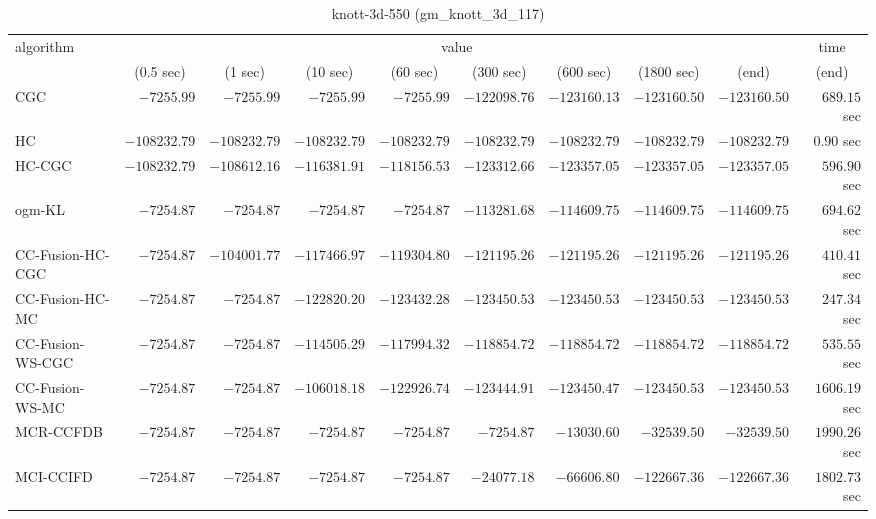 \begin{table}[H]
\scriptsize
\centering
\caption{knott-3d-550 (gm\_knott\_3d\_117)}
\label{tab:anytimetable-knott-3d-550-gm-knott-3d-117}
\begin{tabular}{lrrrrrrrrr}
\toprule
           algorithm &                                   \multicolumn{8}{c}{value} & \multicolumn{1}{c}{time}   \\  
\cmidrule(lr){2-9}\cmidrule(lr){10-10}   
                     & \multicolumn{1}{c}{(0.5 sec)} & \multicolumn{1}{c}{(1 sec)} & \multicolumn{1}{c}{(10 sec)} & \multicolumn{1}{c}{(60 sec)} & \multicolumn{1}{c}{(300 sec)} & \multicolumn{1}{c}{(600 sec)} & \multicolumn{1}{c}{(1800 sec)} & \multicolumn{1}{c}{(end)} & \multicolumn{1}{c}{(end)}   \\ \midrule 
                 CGC & $     -7255.99$ & $     -7255.99$ & $     -7255.99$ & $     -7255.99$ & $   -122098.76$ & $   -123160.13$ & $   -123160.50$ & $   -123160.50$ & $       689.15$ sec   \\ 
                  HC & $   -108232.79$ & $   -108232.79$ & $   -108232.79$ & $   -108232.79$ & $   -108232.79$ & $   -108232.79$ & $   -108232.79$ & $   -108232.79$ & $         0.90$ sec   \\ 
              HC-CGC & $   -108232.79$ & $   -108612.16$ & $   -116381.91$ & $   -118156.53$ & $   -123312.66$ & $   -123357.05$ & $   -123357.05$ & $   -123357.05$ & $       596.90$ sec   \\ 
              ogm-KL & $     -7254.87$ & $     -7254.87$ & $     -7254.87$ & $     -7254.87$ & $   -113281.68$ & $   -114609.75$ & $   -114609.75$ & $   -114609.75$ & $       694.62$ sec   \\ 
    CC-Fusion-HC-CGC & $     -7254.87$ & $   -104001.77$ & $   -117466.97$ & $   -119304.80$ & $   -121195.26$ & $   -121195.26$ & $   -121195.26$ & $   -121195.26$ & $       410.41$ sec   \\ 
     CC-Fusion-HC-MC & $     -7254.87$ & $     -7254.87$ & $   -122820.20$ & $   -123432.28$ & $   -123450.53$ & $   -123450.53$ & $   -123450.53$ & $   -123450.53$ & $       247.34$ sec   \\ 
    CC-Fusion-WS-CGC & $     -7254.87$ & $     -7254.87$ & $   -114505.29$ & $   -117994.32$ & $   -118854.72$ & $   -118854.72$ & $   -118854.72$ & $   -118854.72$ & $       535.55$ sec   \\ 
     CC-Fusion-WS-MC & $     -7254.87$ & $     -7254.87$ & $   -106018.18$ & $   -122926.74$ & $   -123444.91$ & $   -123450.47$ & $   -123450.53$ & $   -123450.53$ & $      1606.19$ sec   \\ 
\cmidrule{1-1} 
           MCR-CCFDB & $     -7254.87$ & $     -7254.87$ & $     -7254.87$ & $     -7254.87$ & $     -7254.87$ & $    -13030.60$ & $    -32539.50$ & $    -32539.50$ & $      1990.26$ sec   \\ 
\cmidrule{1-1} 
           MCI-CCIFD & $     -7254.87$ & $     -7254.87$ & $     -7254.87$ & $     -7254.87$ & $    -24077.18$ & $    -66606.80$ & $   -122667.36$ & $   -122667.36$ & $      1802.73$ sec   \\ 
\bottomrule
\end{tabular}
\end{table}

